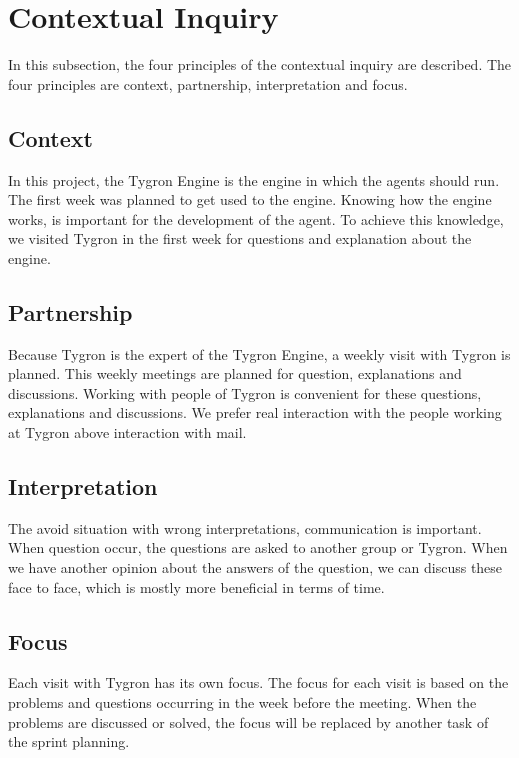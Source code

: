 \newpage

\section{Contextual Inquiry}
In this subsection, the four principles of the contextual inquiry are described. The four principles are context, partnership, interpretation and focus.

\subsection{Context}
In this project, the Tygron Engine is the engine in which the agents should run. The first week was planned to get used to the engine. Knowing how the engine works, is important for the development of the agent. To achieve this knowledge, we visited Tygron in the first week for questions and explanation about the engine.  

\subsection{Partnership}
Because Tygron is the expert of the Tygron Engine, a weekly visit with Tygron is planned. This weekly meetings are planned for question, explanations and discussions. Working with people of Tygron is convenient for these questions, explanations and discussions. We prefer real interaction with the people working at Tygron above interaction with mail.

\subsection{Interpretation}
The avoid situation with wrong interpretations, communication is important. When question occur, the questions are asked to another group or Tygron. When we have another opinion about the answers of the question, we can discuss these face to face, which is mostly more beneficial in terms of time. 

\subsection{Focus}
Each visit with Tygron has its own focus. The focus for each visit is based on the problems and questions occurring in the week before the meeting. When the problems are discussed or solved, the focus will be replaced by another task of the sprint planning. 

\newpage

